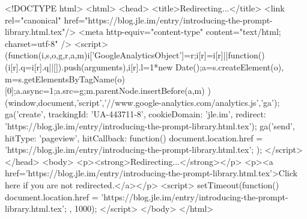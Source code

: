 <!DOCTYPE html>
<html>
<head>
<title>Redirecting...</title>
<link rel="canonical" href="https://blog.jle.im/entry/introducing-the-prompt-library.html.tex"/>
<meta http-equiv="content-type" content="text/html; charset=utf-8" />
<script>
(function(i,s,o,g,r,a,m){i['GoogleAnalyticsObject']=r;i[r]=i[r]||function(){
(i[r].q=i[r].q||[]).push(arguments)},i[r].l=1*new Date();a=s.createElement(o),
m=s.getElementsByTagName(o)[0];a.async=1;a.src=g;m.parentNode.insertBefore(a,m)
})(window,document,'script','//www.google-analytics.com/analytics.js','ga');
ga('create', { trackingId: 'UA-443711-8', cookieDomain: 'jle.im', redirect: 'https://blog.jle.im/entry/introducing-the-prompt-library.html.tex'});
ga('send', { hitType: 'pageview', hitCallback: function() { document.location.href = 'https://blog.jle.im/entry/introducing-the-prompt-library.html.tex'; } });
</script>
</head>
<body>
  <p><strong>Redirecting...</strong></p>
  <p><a href='https://blog.jle.im/entry/introducing-the-prompt-library.html.tex'>Click here if you are not redirected.</a></p>
  <script>
    setTimeout(function() { document.location.href = 'https://blog.jle.im/entry/introducing-the-prompt-library.html.tex'; }, 1000);
  </script>
</body>
</html>
